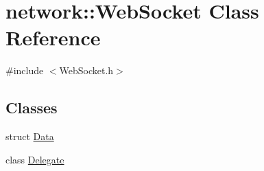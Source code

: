\hypertarget{classnetwork_1_1WebSocket}{}\section{network\+:\+:Web\+Socket Class Reference}
\label{classnetwork_1_1WebSocket}


{\ttfamily \#include $<$Web\+Socket.\+h$>$}

\subsection*{Classes}
\begin{DoxyCompactItemize}
\item 
struct \hyperlink{structnetwork_1_1WebSocket_1_1Data}{Data}
\item 
class \hyperlink{classnetwork_1_1WebSocket_1_1Delegate}{Delegate}
\end{DoxyCompactItemize}
